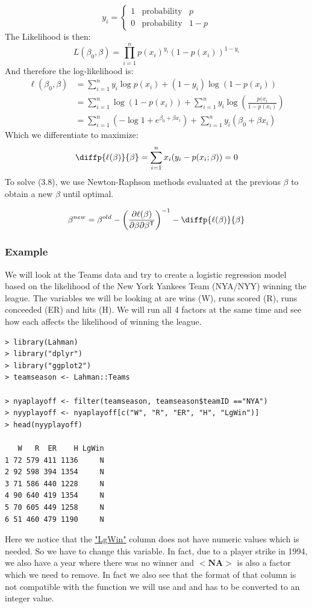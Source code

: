 \documentclass[11pt,a4paper]{report}
\begin{document}
\[ y_i = \left\{ \begin{array}{rcl}
        1 & \mbox{probability} & p \\
        0 & \mbox{probability} & 1-p
        \end{array}\right.
\]
The Likelihood is then:
\begin{equation}
    L(\beta_0, \beta) = \prod_{i=1}^{n} p(x_i)^{y_i} (1 - p(x_i))^{1 - y_i}
\end{equation}
And therefore the log-likelihood is:
\begin{equation}
    \begin{split}
        \ell(\beta_0, \beta) &= \sum_{i=1}^{n} y_i \log p(x_i) + (1 - y_i) \log (1 - p(x_i))\\
        &= \sum_{i=1}^{n} \log(1 - p(x_i)) + \sum_{i=1}^{n} y_i \log\left(\frac{p(x_i}{1 - p(x_i)}\right)\\
        &= \sum_{i=1}^{n} \left(-\log1 + e^{\beta_0 + \beta x_i}\right) + \sum_{i=1}^{n} y_i (\beta_0 + \beta x_i)
    \end{split}
\end{equation}
Which we differentiate to maximize:
\begin{equation}
    \diffp{\ell(\beta)}{\beta} = \sum_{i=1}^{n} x_i (y_i - p(x_i;\beta)) = 0
\end{equation}
To solve (3.8), we use Newton-Raphson methods evaluated at the previous $\beta$ to obtain a new $\beta$ until optimal.

\[
\beta^{new} = \beta^{old} - \left(\frac{\partial \ell(\beta)}{\partial \beta \partial \beta^\mathsf{T}}\right)^{-1} - \diffp{\ell(\beta)}{\beta}
\]

\subsubsection{Example}
We will look at the Teams data and try to create a logistic regression model based on the likelihood of the New York Yankees Team (NYA/NYY) winning the league. The variables we will be looking at are wins (W), runs scored (R), runs conceeded (ER) and hits (H). We will run all 4 factors at the same time and see how each affects the likelihood of winning the league.
\begin{lstlisting}[basicstyle=\scriptsize]
> library(Lahman)
> library("dplyr")
> library("ggplot2")
> teamseason <- Lahman::Teams

> nyaplayoff <- filter(teamseason, teamseason$teamID =="NYA")
> nyyplayoff <- nyaplayoff[c("W", "R", "ER", "H", "LgWin")]
> head(nyyplayoff)

   W   R  ER    H LgWin
1 72 579 411 1136     N
2 92 598 394 1354     N
3 71 586 440 1228     N
4 90 640 419 1354     N
5 70 605 449 1258     N
6 51 460 479 1190     N
\end{lstlisting}
Here we notice that the \underline{"LgWin"} column does not have numeric values which is needed. So we have to change this variable. In fact, due to a player strike in 1994, we also have a year where there was no winner and $\mathbf{<NA>}$ is also a factor which we need to remove. In fact we also see that the format of that column is not compatible with the function we will use and and has to be converted to an integer value.
\end{document}
